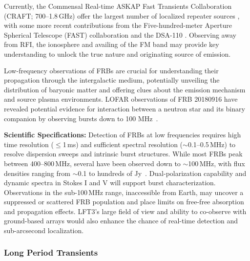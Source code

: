 Currently, the Commensal Real-time ASKAP Fast Transients Collaboration (CRAFT; 700--1.8\,GHz) offer the largest number of localized repeater sources \citep{shannon2024ics, SD_2023}, with some more recent contributions from the Five-hundred-meter Aperture Spherical Telescope (FAST) collaboration \citep[1.00--1.45\,GHz;][]{ZX_2023} and the DSA-110 \citep{LC_2023,sharma2024preferential}. Observing away from RFI, the ionosphere and availing of the FM band may provide key understanding to unlock the true nature and originating source of emission.

Low-frequency observations of FRBs are crucial for understanding their propagation through the intergalactic medium, potentially unveiling the distribution of baryonic matter and offering clues about the emission mechanism and source plasma environments. LOFAR observations of FRB 20180916 have revealed potential evidence for interaction between a neutron star and its binary companion by observing bursts down to 100 MHz~\citep{pleunis2021lofar}.

\textbf{Scientific Specifications:} Detection of FRBs at low frequencies requires high time resolution ($\leq$1\,ms) and sufficient spectral resolution ($\sim$0.1--0.5\,MHz) to resolve dispersion sweeps and intrinsic burst structures. While most FRBs peak between 400--800\,MHz, several have been observed down to $\sim$100\,MHz, with flux densities ranging from $\sim$0.1 to hundreds of Jy~\citep{pleunis2021lofar}. Dual-polarization capability and dynamic spectra in Stokes I and V will support burst characterization. Observations in the sub-100\,MHz range, inaccessible from Earth, may uncover a suppressed or scattered FRB population and place limits on free-free absorption and propagation effects. LFT3's large field of view and ability to co-observe with ground-based arrays would also enhance the chance of real-time detection and sub-arcsecond localization.




\subsubsection{Long Period Transients}

